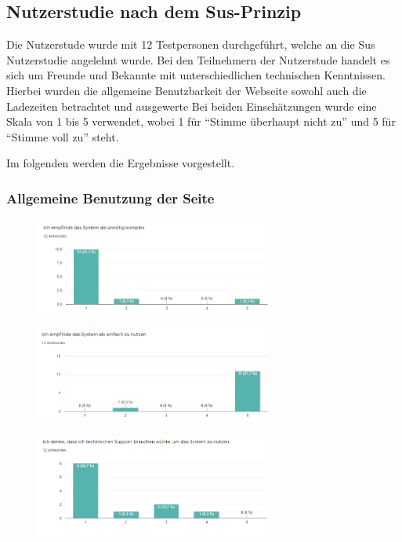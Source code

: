 \subsection{Nutzerstudie nach dem Sus-Prinzip}
Die Nutzerstude wurde mit 12 Testpersonen durchgeführt, welche an die Sus Nutzerstudie angelehnt wurde. 
Bei den Teilnehmern der Nutzerstude handelt es sich um Freunde und Bekannte mit unterschiedlichen technischen Kenntnissen. 
Hierbei wurden die allgemeine Benutzbarkeit der Webseite sowohl auch die Ladezeiten betrachtet und ausgewerte
Bei beiden Einschätzungen wurde eine Skala von 1 bis 5 verwendet, wobei 1 für \enquote{Stimme überhaupt nicht zu} und 5 für \enquote{Stimme voll zu} steht.

Im folgenden werden die Ergebnisse vorgestellt.
\subsubsection{Allgemeine Benutzung der Seite}
\begin{figure}[H]
    \centering
    \includegraphics[width=0.7\textwidth]{media/survey/complexity.png}
\end{figure}

\noChanges

\begin{figure}[H]
    \centering
    \includegraphics[width=0.7\textwidth]{media/survey/easyUsage.png}
\end{figure}

\noChanges

\begin{figure}[H]
    \centering
    \includegraphics[width=0.7\textwidth]{media/survey/technicalSupport.png}
\end{figure}

